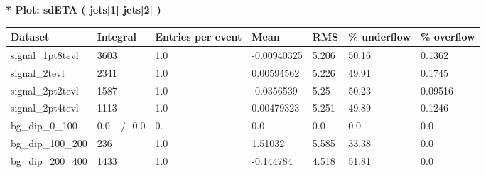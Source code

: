 \documentclass[a4paper, 10pt]{article}
\begin{document}
\textbf{* Plot: sdETA ( jets[1] jets[2] ) }\\
   \begin{table}[H]
  \begin{center}
    \begin{tabular}{|m{23.0mm}|m{23.0mm}|m{18.0mm}|m{19.0mm}|m{19.0mm}|m{19.0mm}|m{19.0mm}|}
      \hline
      {\cellcolor{yellow}         Dataset}& {\cellcolor{yellow}         Integral}& {\cellcolor{yellow}         Entries per event}& {\cellcolor{yellow}         Mean}& {\cellcolor{yellow}         RMS}& {\cellcolor{yellow}         \% underflow}& {\cellcolor{yellow}         \% overflow}\\
      \hline
      {\cellcolor{white}         signal\_1pt8tevl}& {\cellcolor{white}         3603}& {\cellcolor{white}         1.0}& {\cellcolor{white}         -0.00940325}& {\cellcolor{white}         5.206}& {\cellcolor{red}         50.16}& {\cellcolor{red}         0.1362}\\
      \hline
      {\cellcolor{white}         signal\_2tevl}& {\cellcolor{white}         2341}& {\cellcolor{white}         1.0}& {\cellcolor{white}         0.00594562}& {\cellcolor{white}         5.226}& {\cellcolor{red}         49.91}& {\cellcolor{red}         0.1745}\\
      \hline
      {\cellcolor{white}         signal\_2pt2tevl}& {\cellcolor{white}         1587}& {\cellcolor{white}         1.0}& {\cellcolor{white}         -0.0356539}& {\cellcolor{white}         5.25}& {\cellcolor{red}         50.23}& {\cellcolor{red}         0.09516}\\
      \hline
      {\cellcolor{white}         signal\_2pt4tevl}& {\cellcolor{white}         1113}& {\cellcolor{white}         1.0}& {\cellcolor{white}         0.00479323}& {\cellcolor{white}         5.251}& {\cellcolor{red}         49.89}& {\cellcolor{red}         0.1246}\\
      \hline
      {\cellcolor{white}         bg\_dip\_0\_100}& {\cellcolor{white}         0.0 +/\-- 0.0}& {\cellcolor{white}         0.}& {\cellcolor{white}         0.0}& {\cellcolor{white}         0.0}& {\cellcolor{green}         0.0}& {\cellcolor{green}         0.0}\\
      \hline
      {\cellcolor{white}         bg\_dip\_100\_200}& {\cellcolor{white}         236}& {\cellcolor{white}         1.0}& {\cellcolor{white}         1.51032}& {\cellcolor{white}         5.585}& {\cellcolor{red}         33.38}& {\cellcolor{red}         0.0}\\
      \hline
      {\cellcolor{white}         bg\_dip\_200\_400}& {\cellcolor{white}         1433}& {\cellcolor{white}         1.0}& {\cellcolor{white}         -0.144784}& {\cellcolor{white}         4.518}& {\cellcolor{red}         51.81}& {\cellcolor{red}         0.0}\\

\end{tabular}
\end{center}
\end{table}
\end{document}
